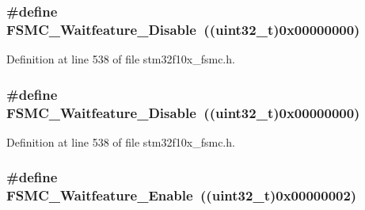 \subsubsection[{\texorpdfstring{F\+S\+M\+C\+\_\+\+Waitfeature\+\_\+\+Disable}{FSMC_Waitfeature_Disable}}]{\setlength{\rightskip}{0pt plus 5cm}\#define F\+S\+M\+C\+\_\+\+Waitfeature\+\_\+\+Disable~(({\bf uint32\+\_\+t})0x00000000)}\hypertarget{group___f_s_m_c___wait__feature_ga8a31f05576e66546fbbcdb06ff67da7d}{}\label{group___f_s_m_c___wait__feature_ga8a31f05576e66546fbbcdb06ff67da7d}


Definition at line 538 of file stm32f10x\+\_\+fsmc.\+h.

\subsubsection[{\texorpdfstring{F\+S\+M\+C\+\_\+\+Waitfeature\+\_\+\+Disable}{FSMC_Waitfeature_Disable}}]{\setlength{\rightskip}{0pt plus 5cm}\#define F\+S\+M\+C\+\_\+\+Waitfeature\+\_\+\+Disable~(({\bf uint32\+\_\+t})0x00000000)}\hypertarget{group___f_s_m_c___wait__feature_ga8a31f05576e66546fbbcdb06ff67da7d}{}\label{group___f_s_m_c___wait__feature_ga8a31f05576e66546fbbcdb06ff67da7d}


Definition at line 538 of file stm32f10x\+\_\+fsmc.\+h.

\subsubsection[{\texorpdfstring{F\+S\+M\+C\+\_\+\+Waitfeature\+\_\+\+Enable}{FSMC_Waitfeature_Enable}}]{\setlength{\rightskip}{0pt plus 5cm}\#define F\+S\+M\+C\+\_\+\+Waitfeature\+\_\+\+Enable~(({\bf uint32\+\_\+t})0x00000002)}\hypertarget{group___f_s_m_c___wait__feature_ga3113366130dfbf6d116f1afb94af1726}{}\label{group___f_s_m_c___wait__feature_ga3113366130dfbf6d116f1afb94af1726}


